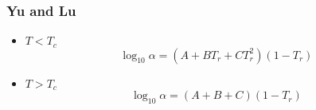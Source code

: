 \subsubsection{Yu and Lu\cite{yuLu}}

\begin{itemize}
\item{$T < T_c$}
\begin{equation}
 \log_{10}{\alpha} = \left(A+B T_r+ C T_r^2\right)\left(1-T_r\right)
\end{equation}
\item{$T > T_c$}
\begin{equation}
 \log_{10}{\alpha} = \left(A+B+C \right)\left(1-T_r\right)
\end{equation}
\end{itemize}